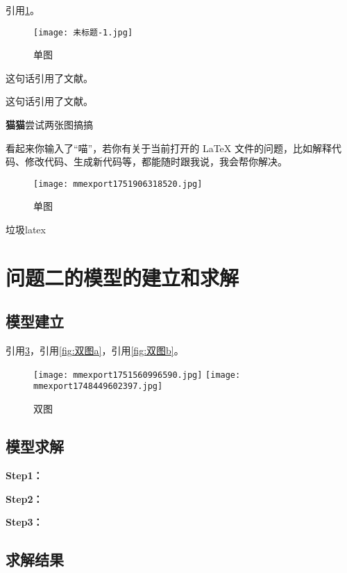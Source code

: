 \documentclass{cumcmthesis}
\begin{document}
引用\cref{fig:山田凉}。

\begin{figure}[H]
\centering
\texttt{[image: 未标题-1.jpg]}
\caption{单图}
\label{fig:山田凉}
\end{figure}

这句话引用了文献\cite{司守奎2011数学建模算法与应用}。

这句话引用了文献。

\textbf{猫猫}尝试两张图搞搞

看起来你输入了“喵”，若你有关于当前打开的 LaTeX 文件的问题，比如解释代码、修改代码、生成新代码等，都能随时跟我说，我会帮你解决。
\begin{figure}[H]
\centering
\texttt{[image: mmexport1751906318520.jpg]}
\caption{单图}
\label{fig:新图}
\end{figure}

垃圾latex

\section{问题二的模型的建立和求解}
\subsection{模型建立}

引用\cref{fig:双图}，引用\cref{fig:双图a}，引用\cref{fig:双图b}。

\begin{figure}[ht]
\centering
{}
{\texttt{[image: mmexport1751560996590.jpg]}}
{\texttt{[image: mmexport1748449602397.jpg]}}
\caption{双图}\label{fig:双图}
\end{figure} 

\subsection{模型求解}

\textbf{Step1：} 

\textbf{Step2：} 

\textbf{Step3：} 

\subsection{求解结果}

\end{document}
